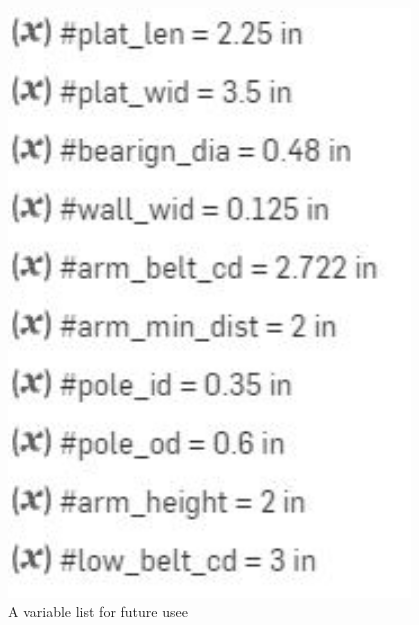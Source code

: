 \begin{figure}[ht]
\centering
\begin{minipage}[b]{.48\textwidth}
  \centering
  \includegraphics[width=0.95\textwidth]{Meetings/November/11-18-21/11-18-21_CAD_Figure1 - Nathan Forrer.JPG}
  \caption{A variable list for future usee}
  \label{fig:pic1}
\end{minipage}%
\hfill%
\begin{minipage}[b]{.48\textwidth}
  \centering

\end{minipage}
\end{figure}
